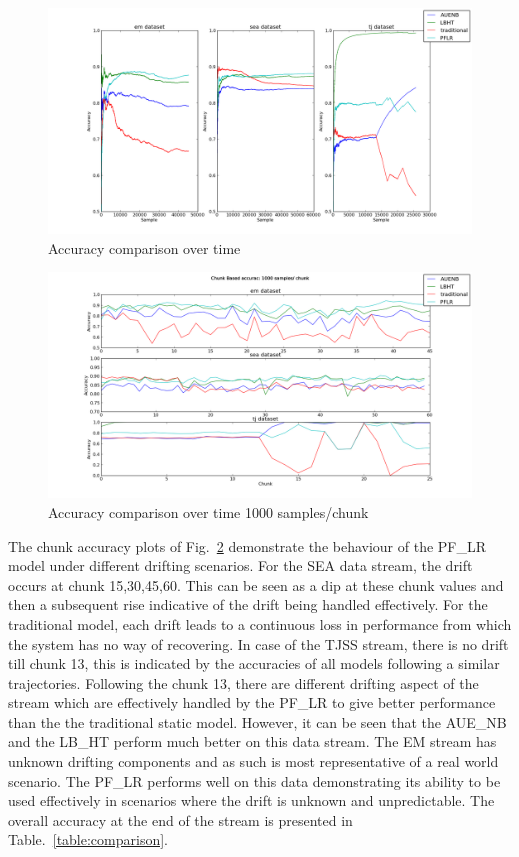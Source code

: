 \documentclass[conference]{IEEEtran}
\begin{document}
\begin{figure}
\captionsetup{justification=centering}
\centering
\includegraphics[scale=0.4]{fig/running_accuracy.png}
\caption{Accuracy comparison over time}
\label{fig:runningaccuracy} 
\end{figure}

\begin{figure}
\captionsetup{justification=centering}
\centering
\includegraphics[scale=0.2]{fig/chunk_accuracy.png}
\caption{Accuracy comparison over time 1000 samples/chunk}
\label{fig:chunkaccuracy} 
\end{figure}

The chunk accuracy plots of Fig.~\ref{fig:chunkaccuracy} demonstrate the behaviour of the PF\_LR model under different drifting scenarios. For the SEA data stream, the drift occurs at chunk 15,30,45,60. This can be seen as a dip at these chunk values and then a subsequent rise indicative of the drift  being handled effectively. For the traditional model, each drift leads to a continuous loss in performance from  which the system has no way of recovering. In case of the TJSS stream, there is no drift till chunk 13, this is indicated by the accuracies of all models following a similar trajectories. Following the chunk 13, there are different drifting aspect of the stream which are effectively handled by the PF\_LR to give better performance than the the traditional static model. However, it can be seen that the AUE\_NB and the LB\_HT perform much better on this data stream. The EM stream has unknown drifting components and as such is most representative of a real world scenario. The PF\_LR performs well on this data demonstrating its ability to be used effectively in scenarios where the drift is unknown and unpredictable. The overall accuracy at the end of the stream is presented in Table.~\ref{table:comparison}.
\end{document}
